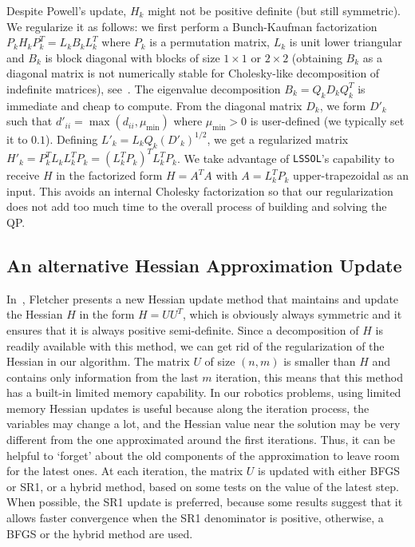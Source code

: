 Despite Powell's update, $H_{k}$ might not be positive definite (but still symmetric).
We regularize it as follows: we first perform a Bunch-Kaufman factorization $P_k H_k P_k^T= L_k B_k L_k^T$ where $P_k$ is a permutation matrix, $L_k$ is unit lower triangular and $B_k$ is block diagonal with blocks of size $1 \times 1$ or $2\times 2$ (obtaining $B_k$ as a diagonal matrix is not numerically stable for Cholesky-like decomposition of indefinite matrices), see~\cite{golub:book:1996}.
The eigenvalue decomposition $B_k = Q_k D_k Q_k^T$ is immediate and cheap to compute.
From the diagonal matrix $D_k$, we form $D'_k$ such that $d'_{ii} = \max\left(d_{ii},\mu_{\min}\right)$ where $\mu_{\min}>0$ is user-defined (we typically set it to $0.1$).
Defining $L'_k = L_k Q_k {(D'_k)}^{1/2}$, we get a regularized matrix $H'_k = P_k^T L_k L_k^T P_k = (L_k^T P_k)^T L_k^T P_k$.
We take advantage of {\tt LSSOL}'s capability to receive $H$ in the factorized form $H=A^TA$ with $A=L_k^T P_k$ upper-trapezoidal as an input.
This avoids an internal Cholesky factorization so that our regularization does not add too much time to the overall process of building and solving the QP.\@

\subsection{An alternative Hessian Approximation Update}
\label{sub:an_alternative_hessian_approximation_update}

In~\cite{Fletcher:ifip:2006}, Fletcher presents a new Hessian update method that maintains and update the Hessian $H$ in the form $H=U U^T$, which is obviously always symmetric and it ensures that it is always positive semi-definite.
Since a decomposition of $H$ is readily available with this method, we can get rid of the regularization of the Hessian in our algorithm.
The matrix $U$ of size $(n,m)$ is smaller than $H$ and contains only information from the last $m$ iteration, this means that this method has a built-in limited memory capability.
In our robotics problems, using limited memory Hessian updates is useful because along the iteration process, the variables may change a lot, and the Hessian value near the solution may be very different from the one approximated around the first iterations.
Thus, it can be helpful to `forget' about the old components of the approximation to leave room for the latest ones.
At each iteration, the matrix $U$ is updated with either BFGS or SR1, or a hybrid method, based on some tests on the value of the latest step.
When possible, the SR1 update is preferred, because some results suggest that it allows faster convergence when the SR1 denominator is positive, otherwise, a BFGS or the hybrid method are used.

